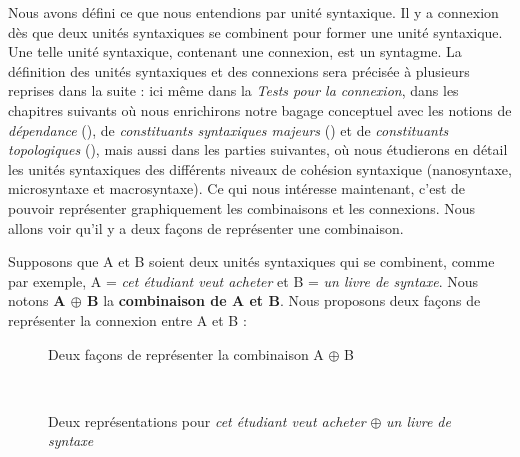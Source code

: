 Nous avons défini ce que nous entendions par unité syntaxique. Il y a connexion dès que deux unités syntaxiques se combinent pour former une unité syntaxique. Une telle unité syntaxique, contenant une connexion, est un syntagme. La définition des unités syntaxiques et des connexions sera précisée à plusieurs reprises dans la suite : ici même dans la  \textit{Tests pour la connexion}, dans les chapitres suivants où nous enrichirons notre bagage conceptuel avec les notions de \textit{dépendance} (), de \textit{constituants syntaxiques majeurs} () et de \textit{constituants topologiques} (), mais aussi dans les parties suivantes, où nous étudierons en détail les unités syntaxiques des différents niveaux de cohésion syntaxique (nanosyntaxe, microsyntaxe et macrosyntaxe). Ce qui nous intéresse maintenant, c’est de pouvoir représenter graphiquement les combinaisons et les connexions. Nous allons voir qu’il y a deux façons de représenter une combinaison.

Supposons que A et B soient deux unités syntaxiques qui se combinent, comme par exemple, A = \textit{cet étudiant veut acheter} et B = \textit{un livre de syntaxe}. Nous notons \textbf{A ${\oplus}$ B} la \textbf{combinaison de A et B}. Nous proposons deux façons de représenter la connexion entre A et B :

\begin{figure}
\caption{\label{fig:}Deux façons de représenter la combinaison A $\oplus$ B}
\end{figure}

\begin{figure}
\medskip\\
\caption{\label{fig:}Deux représentations pour \textit{cet étudiant veut acheter} $\oplus$ \textit{un livre de syntaxe}}
\end{figure}

